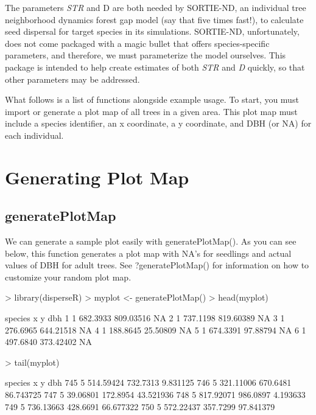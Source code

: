 \documentclass{article}
\begin{document}
The parameters \textit{STR} and {D} are both needed by SORTIE-ND, an individual tree neighborhood dynamics forest gap model (say that five times fast!), to calculate seed dispersal for target species in its simulations. SORTIE-ND, unfortunately, does not come packaged with a magic bullet that offers species-specific parameters, and therefore, we must parameterize the model ourselves. This package is intended to help create estimates of both \textit{STR} and \textit{D} quickly, so that other parameters may be addressed.

What follows is a list of functions alongside example usage. To start, you must import or generate a plot map of all trees in a given area. This plot map must include a species identifier, an x coordinate, a y coordinate, and DBH (or NA) for each individual.

\section{Generating Plot Map}

\subsection{generatePlotMap}
We can generate a sample plot easily with generatePlotMap(). As you can see below, this function generates a plot map with NA's for seedlings and actual values of DBH for adult trees. See ?generatePlotMap() for information on how to customize your random plot map.
\begin{Schunk}
\begin{Sinput}
> library(disperseR)
> myplot <- generatePlotMap()
> head(myplot)
\end{Sinput}
\begin{Soutput}
  species        x         y dbh
1       1 682.3933 809.03516  NA
2       1 737.1198 819.60389  NA
3       1 276.6965 644.21518  NA
4       1 188.8645  25.50809  NA
5       1 674.3391  97.88794  NA
6       1 497.6840 373.42402  NA
\end{Soutput}
\begin{Sinput}
> tail(myplot)
\end{Sinput}
\begin{Soutput}
    species         x        y       dbh
745       5 514.59424 732.7313  9.831125
746       5 321.11006 670.6481 86.743725
747       5  39.06801 172.8954 43.521936
748       5 817.92071 986.0897  4.193633
749       5 736.13663 428.6691 66.677322
750       5 572.22437 357.7299 97.841379
\end{Soutput}
\end{Schunk}
\end{document}
